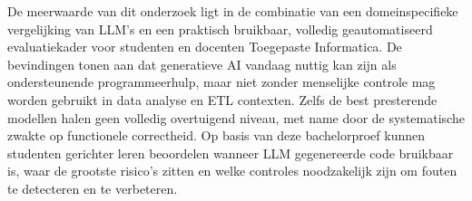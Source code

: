 De meerwaarde van dit onderzoek ligt in de combinatie van een domeinspecifieke vergelijking van LLM's en een praktisch bruikbaar, volledig geautomatiseerd evaluatiekader voor studenten en docenten Toegepaste Informatica. De bevindingen tonen aan dat generatieve AI vandaag nuttig kan zijn als ondersteunende programmeerhulp, maar niet zonder menselijke controle mag worden gebruikt in data analyse en ETL contexten. Zelfs de best presterende modellen halen geen volledig overtuigend niveau, met name door de systematische zwakte op functionele correctheid. Op basis van deze bachelorproef kunnen studenten gerichter leren beoordelen wanneer LLM gegenereerde code bruikbaar is, waar de grootste risico's zitten en welke controles noodzakelijk zijn om fouten te detecteren en te verbeteren.
